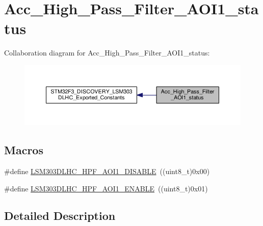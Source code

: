 \hypertarget{group__Acc__High__Pass__Filter__AOI1__status}{\section{Acc\+\_\+\+High\+\_\+\+Pass\+\_\+\+Filter\+\_\+\+A\+O\+I1\+\_\+status}
\label{group__Acc__High__Pass__Filter__AOI1__status}
}
Collaboration diagram for Acc\+\_\+\+High\+\_\+\+Pass\+\_\+\+Filter\+\_\+\+A\+O\+I1\+\_\+status\+:\nopagebreak
\begin{figure}[H]
\begin{center}
\leavevmode
\includegraphics[width=350pt]{group__Acc__High__Pass__Filter__AOI1__status}
\end{center}
\end{figure}
\subsection*{Macros}
\begin{DoxyCompactItemize}
\item 
\#define \hyperlink{group__Acc__High__Pass__Filter__AOI1__status_ga39ffeb24df691729333bc55dd5f129cb}{L\+S\+M303\+D\+L\+H\+C\+\_\+\+H\+P\+F\+\_\+\+A\+O\+I1\+\_\+\+D\+I\+S\+A\+B\+L\+E}~((uint8\+\_\+t)0x00)
\item 
\#define \hyperlink{group__Acc__High__Pass__Filter__AOI1__status_ga22509a27eba6cffe0ce329651a35519e}{L\+S\+M303\+D\+L\+H\+C\+\_\+\+H\+P\+F\+\_\+\+A\+O\+I1\+\_\+\+E\+N\+A\+B\+L\+E}~((uint8\+\_\+t)0x01)
\end{DoxyCompactItemize}


\subsection{Detailed Description}


